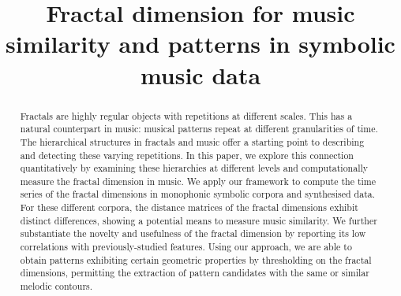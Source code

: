 \documentclass{article}
\title{Fractal dimension for music similarity and patterns in symbolic music data}
\newcommand{\alternative}[1]{{\color{ao(english)}{#1}}}
\begin{document}
%
\maketitle
%
\begin{abstract}
  Fractals are highly regular objects with repetitions at different scales.
  \alternative{(Alternative intro sentence, for a more cross-disciplinary audience in mathematics and complex system research?:
    In mathematics, a fractal is a geometric object which exhibits regularity through self-similarity --- the whole being repeated at different scales, resulting to similar parts of itself.) }
  This has a natural counterpart in music: musical patterns repeat at different granularities of time.
  The hierarchical structures in fractals and music offer a starting point to describing and detecting these varying repetitions. 
  In this paper, we explore this connection quantitatively by examining these hierarchies at different levels and computationally measure the fractal dimension in music.
  We apply our framework to compute the time series of the fractal dimensions in monophonic symbolic corpora and synthesised data.
  For these different corpora, the distance matrices of the fractal dimensions exhibit distinct differences, showing a potential means to measure music similarity. 
  We further substantiate the novelty and usefulness of the fractal dimension by reporting its low correlations with previously-studied features.
  Using our approach, we are able to obtain patterns exhibiting certain geometric properties by thresholding on the fractal dimensions, permitting the extraction of pattern candidates with the same or similar melodic contours.

\end{abstract}




\end{document}
